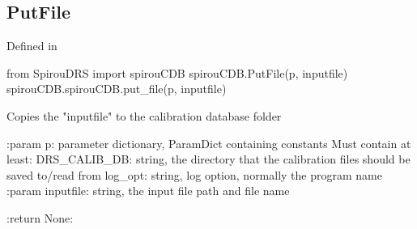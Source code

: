 \begin{minipage}{\textwidth}
\subsection{PutFile}

Defined in \spirouCDB{}

\begin{pythonbox}
from SpirouDRS import spirouCDB
spirouCDB.PutFile(p, inputfile)
spirouCDB.spirouCDB.put_file(p, inputfile)
\end{pythonbox}

\begin{pythondocstring}
Copies the "inputfile" to the calibration database folder

:param p: parameter dictionary, ParamDict containing constants
    Must contain at least:
            DRS_CALIB_DB: string, the directory that the calibration
                          files should be saved to/read from
            log_opt: string, log option, normally the program name
:param inputfile: string, the input file path and file name

:return None:
\end{pythondocstring}
\end{minipage}

